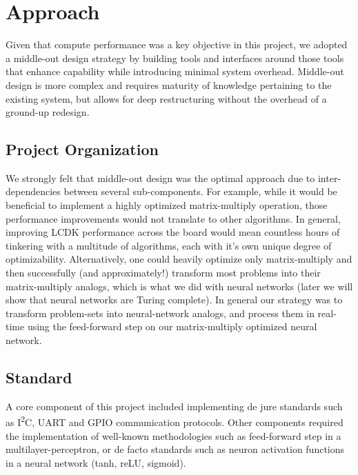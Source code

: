 \section{Approach}

Given that compute performance was a key objective in this project, we adopted a middle-out\cite{middleout} design strategy by building tools and interfaces around those tools that enhance capability while introducing minimal system overhead. Middle-out design is more complex and requires maturity of knowledge pertaining to the existing system, but allows for deep restructuring without the overhead of a ground-up redesign. 

\subsection{ Project Organization}
We strongly felt that middle-out design was the optimal approach due to inter-dependencies between several sub-components. For example, while it would be beneficial to implement a highly optimized matrix-multiply operation, those performance improvements would not translate to other algorithms. In general, improving LCDK performance across the board would mean countless hours of tinkering with a multitude of algorithms, each with it's own unique degree of optimizability. Alternatively, one could heavily optimize only matrix-multiply and then successfully (and approximately!) transform most problems into their matrix-multiply analogs, which is what we did with neural networks (later we will show that neural networks are Turing complete). In general our strategy was to transform problem-sets into neural-network analogs, and process them in real-time using the feed-forward step on our matrix-multiply optimized neural network.

\subsection{Standard}
A core component of this project included implementing de jure standards such as I\textsuperscript{2}C, UART and GPIO communication protocols. Other components required the implementation of well-known methodologies such as feed-forward step in a multilayer-perceptron, or de facto standards such as neuron activation functions in a neural network (tanh, reLU, sigmoid).


